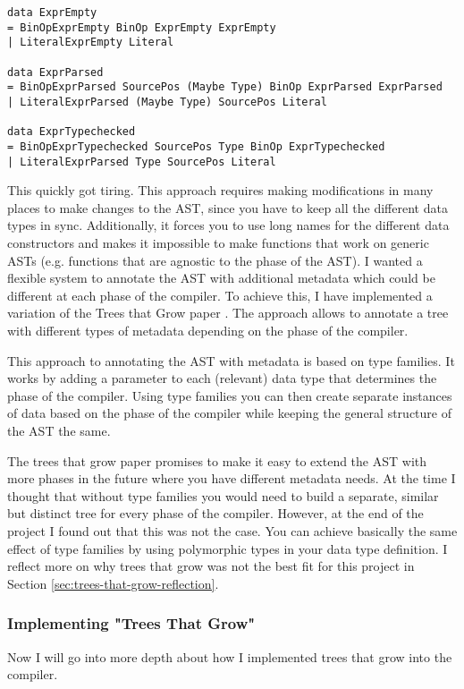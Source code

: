 \documentclass{report}
\begin{document}
\begin{verbatim}
data ExprEmpty 
= BinOpExprEmpty BinOp ExprEmpty ExprEmpty
| LiteralExprEmpty Literal

data ExprParsed
= BinOpExprParsed SourcePos (Maybe Type) BinOp ExprParsed ExprParsed
| LiteralExprParsed (Maybe Type) SourcePos Literal

data ExprTypechecked
= BinOpExprTypechecked SourcePos Type BinOp ExprTypechecked
| LiteralExprParsed Type SourcePos Literal
\end{verbatim} 

This quickly got tiring. This approach requires making modifications in many places to make changes to the AST, since you have to keep all the different data types in sync. Additionally, it forces you to use long names for the different data constructors and makes it impossible to make functions that work on generic ASTs (e.g. functions that are agnostic to the phase of the AST). I wanted a flexible system to annotate the AST with additional metadata which could be different at each phase of the compiler. To achieve this, I have implemented a variation of the Trees that Grow paper \cite{Najd2017trees}. The approach allows to annotate a tree with different types of metadata depending on the phase of the compiler.

This approach to annotating the AST with metadata is based on type families. It works by adding a parameter to each (relevant) data type that determines the phase of the compiler. Using type families you can then create separate instances of data based on the phase of the compiler while keeping the general structure of the AST the same. 

The trees that grow paper promises to make it easy to extend the AST with more phases in the future where you have different metadata needs.
At the time I thought that without type families you would need to build a separate, similar but distinct tree for every phase of the compiler. 
However, at the end of the project I found out that this was not the case. You can achieve basically the same effect of type families by using polymorphic types in your data type definition. I reflect more on why trees that grow was not the best fit for this project in Section \ref{sec:trees-that-grow-reflection}.

\subsubsection{Implementing "Trees That Grow"}
Now I will go into more depth about how I implemented trees that grow into the compiler.
\end{document}
